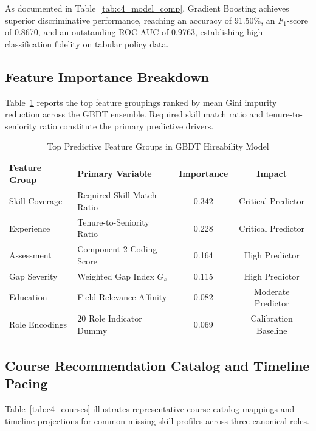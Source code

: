 \documentclass[conference]{IEEEtran}
\begin{document}
As documented in Table~\ref{tab:c4_model_comp}, Gradient Boosting achieves superior discriminative performance, reaching an accuracy of 91.50\%, an $F_1$-score of 0.8670, and an outstanding ROC-AUC of 0.9763, establishing high classification fidelity on tabular policy data.

\subsection{Feature Importance Breakdown}
Table~\ref{tab:c4_feature_imp} reports the top feature groupings ranked by mean Gini impurity reduction across the GBDT ensemble. Required skill match ratio and tenure-to-seniority ratio constitute the primary predictive drivers.

\begin{table}[h]
\centering
\caption{Top Predictive Feature Groups in GBDT Hireability Model}
\label{tab:c4_feature_imp}
\begin{tabular}{@{}llcc@{}}
\toprule
\textbf{Feature Group} & \textbf{Primary Variable} & \textbf{Importance} & \textbf{Impact} \\
\midrule
Skill Coverage & Required Skill Match Ratio & 0.342 & Critical Predictor \\
Experience & Tenure-to-Seniority Ratio & 0.228 & Critical Predictor \\
Assessment & Component 2 Coding Score & 0.164 & High Predictor \\
Gap Severity & Weighted Gap Index $G_s$ & 0.115 & High Predictor \\
Education & Field Relevance Affinity & 0.082 & Moderate Predictor \\
Role Encodings & 20 Role Indicator Dummy & 0.069 & Calibration Baseline \\
\bottomrule
\end{tabular}
\end{table}

\subsection{Course Recommendation Catalog and Timeline Pacing}
Table~\ref{tab:c4_courses} illustrates representative course catalog mappings and timeline projections for common missing skill profiles across three canonical roles.
\end{document}
